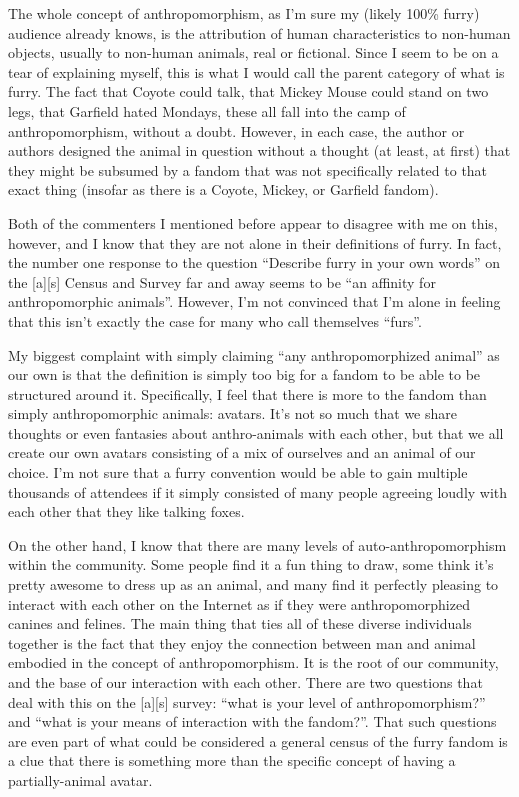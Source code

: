 The whole concept of anthropomorphism, as I'm sure my (likely 100\% furry) audience already knows, is the attribution of human characteristics to non-human objects, usually to non-human animals, real or fictional.  Since I seem to be on a tear of explaining myself, this is what I would call the parent category of what is furry.  The fact that Coyote could talk, that Mickey Mouse could stand on two legs, that Garfield hated Mondays, these all fall into the camp of anthropomorphism, without a doubt.  However, in each case, the author or authors designed the animal in question without a thought (at least, at first) that they might be subsumed by a fandom that was not specifically related to that exact thing (insofar as there is a Coyote, Mickey, or Garfield fandom).

Both of the commenters I mentioned before appear to disagree with me on this, however, and I know that they are not alone in their definitions of furry.  In fact, the number one response to the question ``Describe furry in your own words'' on the [a][s] Census and Survey far and away seems to be ``an affinity for anthropomorphic animals''.  However, I'm not convinced that I'm alone in feeling that this isn't exactly the case for many who call themselves ``furs''.

My biggest complaint with simply claiming ``any anthropomorphized animal'' as our own is that the definition is simply too big for a fandom to be able to be structured around it.  Specifically, I feel that there is more to the fandom than simply anthropomorphic animals: avatars.  It's not so much that we share thoughts or even fantasies about anthro-animals with each other, but that we all create our own avatars consisting of a mix of ourselves and an animal of our choice.  I'm not sure that a furry convention would be able to gain multiple thousands of attendees if it simply consisted of many people agreeing loudly with each other that they like talking foxes.

On the other hand, I know that there are many levels of auto-anthropomorphism within the community.  Some people find it a fun thing to draw, some think it's pretty awesome to dress up as an animal, and many find it perfectly pleasing to interact with each other on the Internet as if they were anthropomorphized canines and felines.  The main thing that ties all of these diverse individuals together is the fact that they enjoy the connection between man and animal embodied in the concept of anthropomorphism.  It is the root of our community, and the base of our interaction with each other.  There are two questions that deal with this on the [a][s] survey: ``what is your level of anthropomorphism?'' and ``what is your means of interaction with the fandom?''.  That such questions are even part of what could be considered a general census of the furry fandom is a clue that there is something more than the specific concept of having a partially-animal avatar.

